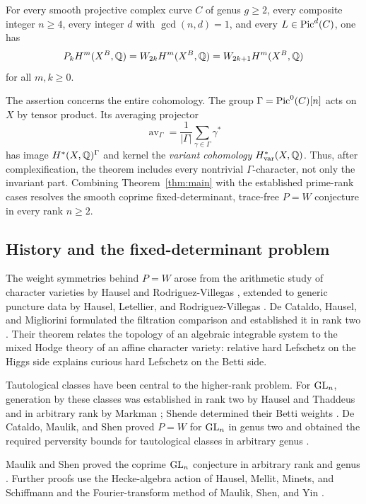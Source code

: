 \begin{theorem}\label{thm:main}
For every smooth projective complex curve $C$ of genus $g\ge2$, every composite integer $n\ge4$, every integer $d$ with $\gcd(n,d)=1$, and every $L\in\operatorname{Pic}^d(C)$, one has
\[
P_kH^m(X^B,\mathbb Q)=W_{2k}H^m(X^B,\mathbb Q)
=W_{2k+1}H^m(X^B,\mathbb Q)
\]
for all $m,k\ge0$.
\end{theorem}

The assertion concerns the entire cohomology. The group
$\Gamma=\operatorname{Pic}^0(C)[n]$ acts on $X$ by tensor product. Its averaging projector
\[
\operatorname{av}_{\Gamma}=\frac1{|\Gamma|}\sum_{\gamma\in\Gamma}\gamma^*
\]
has image $H^*(X,\mathbb Q)^\Gamma$ and kernel the \emph{variant cohomology}
$H^*_{\mathrm{var}}(X,\mathbb Q)$. Thus, after complexification, the theorem includes every nontrivial $\Gamma$-character, not only the invariant part. Combining Theorem~\ref{thm:main} with the established prime-rank cases \cite[Theorem~0.3]{MS2024} resolves the smooth coprime fixed-determinant, trace-free $P=W$ conjecture in every rank $n\ge2$.

\subsection{History and the fixed-determinant problem}

The weight symmetries behind $P=W$ arose from the arithmetic study of character varieties by Hausel and Rodriguez-Villegas \cite{HRV2008}, extended to generic puncture data by Hausel, Letellier, and Rodriguez-Villegas \cite{HLRV2011}. De Cataldo, Hausel, and Migliorini formulated the filtration comparison and established it in rank two \cite{dCHM2012}. Their theorem relates the topology of an algebraic integrable system to the mixed Hodge theory of an affine character variety: relative hard Lefschetz on the Higgs side explains curious hard Lefschetz on the Betti side.

Tautological classes have been central to the higher-rank problem. For $\operatorname{GL}_n$, generation by these classes was established in rank two by Hausel and Thaddeus \cite{HTGenerators2004} and in arbitrary rank by Markman \cite[Theorem~7]{Markman2002}; Shende determined their Betti weights \cite{Shende2017}. De Cataldo, Maulik, and Shen proved $P=W$ for $\operatorname{GL}_n$ in genus two and obtained the required perversity bounds for tautological classes in arbitrary genus \cite[Theorems~0.2 and~0.4--0.6]{dCMSJAMS2022}.

Maulik and Shen proved the coprime $\operatorname{GL}_n$ conjecture in arbitrary rank and genus \cite{MS2024}. Further proofs use the Hecke-algebra action of Hausel, Mellit, Minets, and Schiffmann \cite{HMMS2025} and the Fourier-transform method of Maulik, Shen, and Yin \cite[Theorem~0.4]{MSY2025}.

